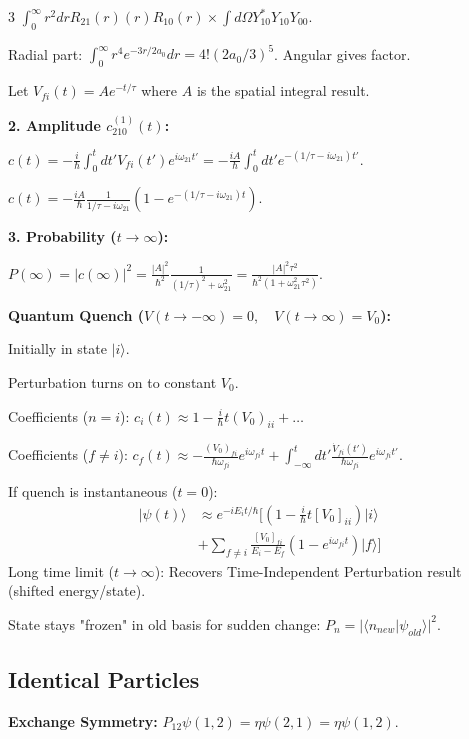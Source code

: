 \documentclass[10pt,a4paper]{article}
\begin{document}
\begin{multicols*}{3}
$\int_0^\infty r^2 dr R_{21}(r) (r) R_{10}(r) \times \int d\Omega Y_{10}^* Y_{10} Y_{00}$.

Radial part: $\int_0^\infty r^4 e^{-3r/2a_0} dr = 4! (2a_0/3)^5$. Angular gives factor.

Let $V_{fi}(t) = A e^{-t/\tau}$ where $A$ is the spatial integral result.

\textbf{2. Amplitude $c_{210}^{(1)}(t)$:}

$c(t) = -\frac{i}{\hbar} \int_0^t dt' V_{fi}(t') e^{i\omega_{21}t'} = -\frac{i A}{\hbar} \int_0^t dt' e^{-(1/\tau - i\omega_{21})t'}$.

$c(t) = -\frac{i A}{\hbar} \frac{1}{1/\tau - i\omega_{21}} (1 - e^{-(1/\tau - i\omega_{21})t})$.

\textbf{3. Probability ($t \to \infty$):}

$P(\infty) = |c(\infty)|^2 = \frac{|A|^2}{\hbar^2} \frac{1}{(1/\tau)^2 + \omega_{21}^2} = \frac{|A|^2 \tau^2}{\hbar^2 (1 + \omega_{21}^2 \tau^2)}$.

\textbf{Quantum Quench ($V(t \to -\infty) = 0, \quad V(t \to \infty) = V_0$):}

Initially in state $|i\rangle$. 

Perturbation turns on to constant $V_0$.

Coefficients ($n=i$): $c_i(t) \approx 1 - \frac{i}{\hbar} t (V_0)_{ii} + \dots$

Coefficients ($f \neq i$):
$c_f(t) \approx -\frac{(V_0)_{fi}}{\hbar \omega_{fi}} e^{i\omega_{fi}t} + \int_{-\infty}^t dt' \frac{\dot{V}_{fi}(t')}{\hbar \omega_{fi}} e^{i\omega_{fi}t'}$.

If quench is instantaneous ($t=0$):
\begin{align*}
    |\psi(t)\rangle &\approx e^{-iE_i t/\hbar} [ \left( 1 - \frac{i}{\hbar}t [V_0]_{ii} \right) |i\rangle  \\ &+ \sum_{f\neq i} \frac{[V_0]_{fi}}{E_i - E_f} (1 - e^{i\omega_{fi}t}) |f\rangle ]
\end{align*}
Long time limit ($t \to \infty$): Recovers Time-Independent Perturbation result (shifted energy/state).

State stays "frozen" in old basis for sudden change: $P_n = |\langle n_{new} | \psi_{old} \rangle|^2$.

\subsection*{Identical Particles}

\textbf{Exchange Symmetry:} $P_{12}\psi(1,2) = \eta\psi(2,1) = \eta\psi(1,2)$.


\end{multicols*}
\end{document}

